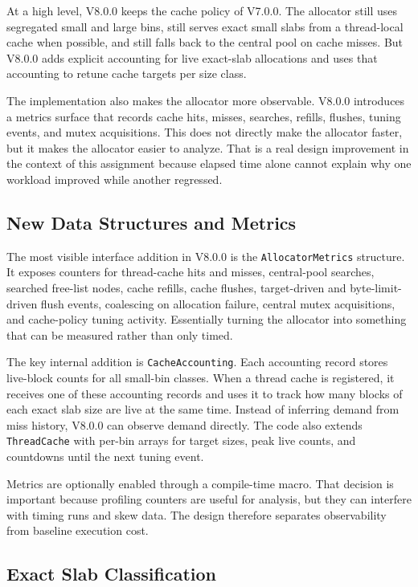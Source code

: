 At a high level, V8.0.0 keeps the cache policy of V7.0.0. The allocator still uses segregated small and large
bins, still serves exact small slabs from a thread-local cache when possible, and still falls back to the
central pool on cache misses. But V8.0.0 adds explicit accounting for live exact-slab allocations and uses
that accounting to retune cache targets per size class.

The implementation also makes the allocator more observable. V8.0.0 introduces a metrics surface that records
cache hits, misses, searches, refills, flushes, tuning events, and mutex acquisitions. This does not directly
make the allocator faster, but it makes the allocator easier to analyze. That is a real design improvement in
the context of this assignment because elapsed time alone cannot explain why one workload improved while
another regressed.

\subsection{New Data Structures and Metrics}

The most visible interface addition in V8.0.0 is the \texttt{AllocatorMetrics} structure. It exposes counters
for thread-cache hits and misses, central-pool searches, searched free-list nodes, cache refills, cache
flushes, target-driven and byte-limit-driven flush events, coalescing on allocation failure, central mutex
acquisitions, and cache-policy tuning activity. Essentially turning the allocator into something that can
be measured rather than only timed.

The key internal addition is \texttt{CacheAccounting}. Each accounting record stores live-block counts for all
small-bin classes. When a thread cache is registered, it receives one of these accounting records and uses it
to track how many blocks of each exact slab size are live at the same time. Instead of inferring demand from
miss history, V8.0.0 can observe demand directly. The code also extends \texttt{ThreadCache} with per-bin arrays
for target sizes, peak live counts, and countdowns until the next tuning event.

Metrics are optionally enabled through a compile-time macro. That decision is important because profiling
counters are useful for analysis, but they can interfere with timing runs and skew data. The design therefore
separates observability from baseline execution cost.

\subsection{Exact Slab Classification}


